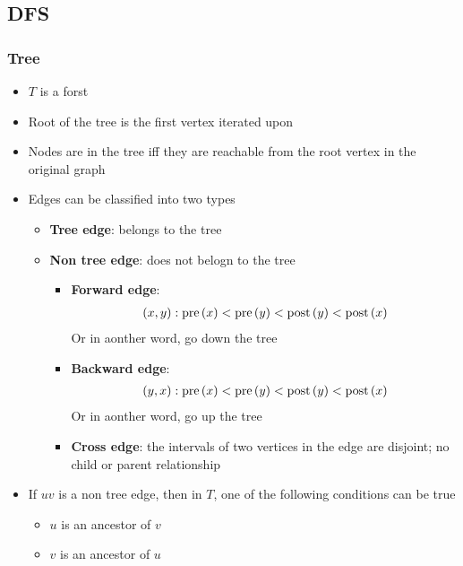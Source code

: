   \subsection{DFS}

    \subsubsection{Tree}

      \begin{itemize}
        \item $ T $ is a forst
        \item Root of the tree is the first vertex iterated upon
        \item Nodes are in the tree iff they are reachable from the root vertex
        in the original graph
        \item Edges can be classified into two types
        \begin{itemize}
          \item \textbf{Tree edge}: belongs to the tree
          \item \textbf{Non tree edge}: does not belogn to the tree
          \begin{itemize}
            \item \textbf{Forward edge}:
            \begin{align*}
              \left( x, y \right):
              \operatorname{pre}\left( x \right)
              < \operatorname{pre}\left( y \right)
              < \operatorname{post}\left( y \right)
              < \operatorname{post}\left( x \right)
            \end{align*}
            Or in aonther word, go down the tree

            \item \textbf{Backward edge}:
            \begin{align*}
              \left( y, x \right):
              \operatorname{pre}\left( x \right)
              < \operatorname{pre}\left( y \right)
              < \operatorname{post}\left( y \right)
              < \operatorname{post}\left( x \right)
            \end{align*}
            Or in aonther word, go up the tree

            \item \textbf{Cross edge}: the intervals of two vertices in the
            edge are disjoint; no child or parent relationship
          \end{itemize}
        \end{itemize}

        \item If $ uv $ is a non tree edge, then in $ T $, one of the following
        conditions can be true
        \begin{itemize}
          \item $ u $ is an ancestor of $ v $
          \item $ v $ is an ancestor of $ u $
        \end{itemize}
      \end{itemize}

